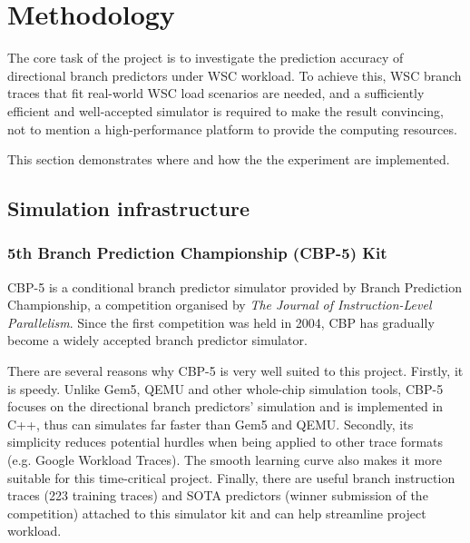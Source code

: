 
\chapter{Methodology}

The core task of the project is to investigate the prediction accuracy of directional branch predictors
under WSC workload. To achieve this, WSC branch traces that fit real-world WSC load scenarios are 
needed, and a sufficiently efficient and well-accepted simulator is required to make the result 
convincing, not to mention a high-performance platform to provide the computing resources.

This section demonstrates where and how the the experiment are implemented.

\ifpdf
    \graphicspath{{Chapter2/Figs/Raster/}{Chapter2/Figs/PDF/}{Chapter2/Figs/}}
\else
    \graphicspath{{Chapter2/Figs/Vector/}{Chapter2/Figs/}}
\fi

\section{Simulation infrastructure}

\subsection{5th Branch Prediction Championship (CBP-5) Kit}

CBP-5 \cite{noauthor_championship_nodate} is a conditional branch predictor simulator provided by Branch Prediction Championship, a competition organised by \textit{The Journal of Instruction-Level Parallelism}. Since the first competition was held in 2004, CBP has gradually become a widely accepted branch predictor simulator. \par\hspace*{\fill}\par

There are several reasons why CBP-5 is very well suited to this project. Firstly, it is speedy. Unlike 
Gem5, QEMU and other whole-chip simulation tools, CBP-5 focuses on the directional branch 
predictors' simulation and is implemented in C++, thus can simulates far faster than Gem5 and QEMU. Secondly, its simplicity reduces potential hurdles when being applied to other trace formats (e.g. Google Workload Traces). The smooth learning curve also makes it more suitable for this time-critical project. Finally, there are useful branch instruction traces (223 training traces) and SOTA predictors (winner submission of the competition) attached to this simulator kit and can help streamline project workload.

